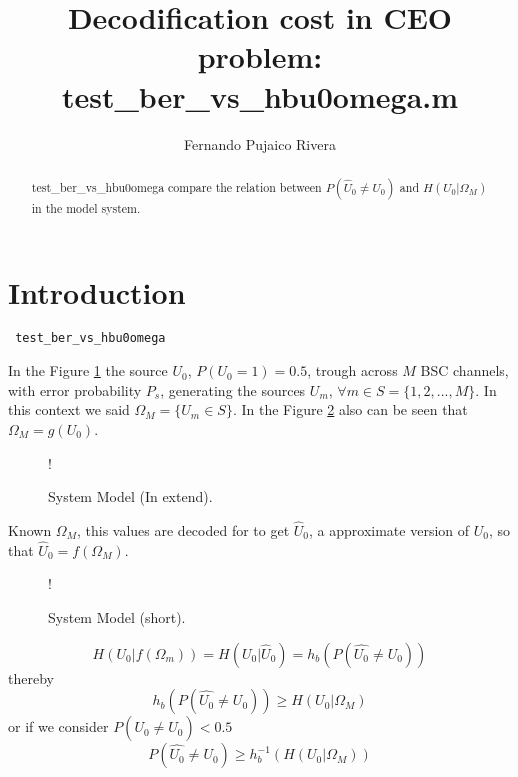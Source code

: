 \documentclass[a4paper,10pt]{article}
\title{Decodification cost in CEO problem: test\_ber\_vs\_hbu0omega.m}
\author{Fernando Pujaico Rivera}
\begin{document}
\maketitle
\begin{abstract}
test\_ber\_vs\_hbu0omega compare the relation between $P(\hat{U}_0 \neq U_0)$ and
$H(U_0|\Omega_M)$ in the model  system.
\end{abstract}

\section{Introduction}

\lstset{language=octave}%
\begin{lstlisting}
 test_ber_vs_hbu0omega
\end{lstlisting}
In the Figure \ref{fig:modelo} the source $U_0$, $P(U_0=1)=0.5$, trough across 
$M$ BSC channels, with error probability $P_s$, generating the  sources $U_m$, 
$\forall m \in S=\{1, 2, ..., M\}$. In this context we said $\Omega_M=\{U_m \in S\}$.
In the Figure \ref{fig:modelo2} also can be seen that $\Omega_M=g(U_0)$.
\begin{figure}[h!bt]
\centering
\resizebox {0.9\columnwidth} {!} {  }
\caption{System Model (In extend).} \label{fig:modelo}
\end{figure}
Known $\Omega_M$, this values are decoded for to get $\hat{U}_0$, a approximate 
version of $U_0$, so that $\hat{U}_0=f(\Omega_M)$.
\begin{figure}[h!bt]
\centering
\resizebox {0.9\columnwidth} {!} {  }
\caption{System Model (short).} \label{fig:modelo2}
\end{figure}

\begin{equation}
H(U_0|f(\Omega_m)) = H(U_0|\hat{U}_0) = h_b(P(\hat{U_0} \neq U_0))
\end{equation}
thereby
\begin{equation}
h_b(P(\hat{U_0} \neq U_0)) \geq H(U_0|\Omega_M) 
\end{equation}
or if we consider $P(\hat{U_0} \neq U_0)<0.5$
\begin{equation}
P(\hat{U_0} \neq U_0) \geq h_b^{-1}(H(U_0|\Omega_M))
\end{equation}
\end{document}
